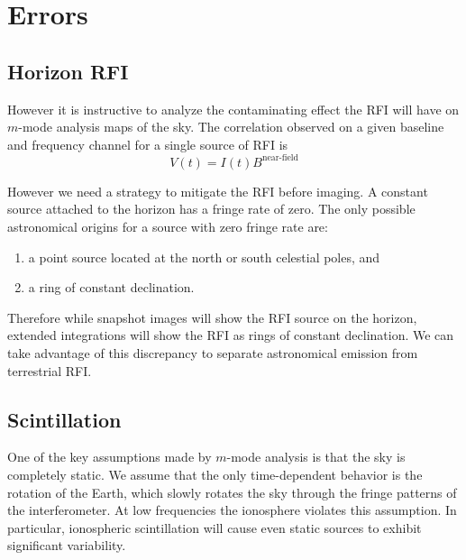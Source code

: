 \documentclass[twocolumn]{aastex6}
\begin{document}
\section{Errors}

\subsection{Horizon RFI}

However it is instructive to analyze the contaminating effect the RFI will have
on $m$-mode analysis maps of the sky. The correlation observed on a given
baseline and frequency channel for a single source of RFI is
\begin{equation}
    V(t) = I(t) B^\textrm{near-field}
\end{equation}

However we need a strategy to mitigate the RFI before imaging. A constant source attached to the
horizon has a fringe rate of zero. The only possible astronomical origins for a source with zero
fringe rate are:

\begin{enumerate}
    \item a point source located at the north or south celestial poles, and
    \item a ring of constant declination.
\end{enumerate}

Therefore while snapshot images will show the RFI source on the horizon, extended integrations will
show the RFI as rings of constant declination. We can take advantage of this discrepancy to separate
astronomical emission from terrestrial RFI.




\subsection{Scintillation}

One of the key assumptions made by $m$-mode analysis is that the sky is completely static.  We
assume that the only time-dependent behavior is the rotation of the Earth, which slowly rotates the
sky through the fringe patterns of the interferometer. At low frequencies the ionosphere violates
this assumption. In particular, ionospheric scintillation will cause even static sources to exhibit
significant variability.
\end{document}
